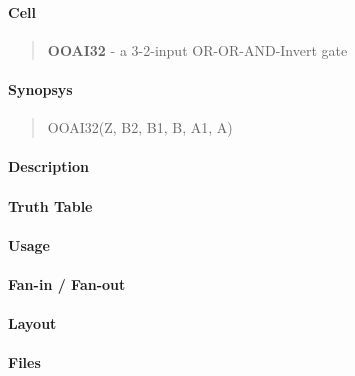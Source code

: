 \label{OOAI32}
\paragraph{Cell}
\begin{quote}
    \textbf{OOAI32} - a 3-2-input OR-OR-AND-Invert gate
\end{quote}

\paragraph{Synopsys}
\begin{quote}
    OOAI32(Z, B2, B1, B, A1, A)
\end{quote}

\paragraph{Description}



\paragraph{Truth Table}


\paragraph{Usage}

\paragraph{Fan-in / Fan-out}

\paragraph{Layout}

\paragraph{Files}
